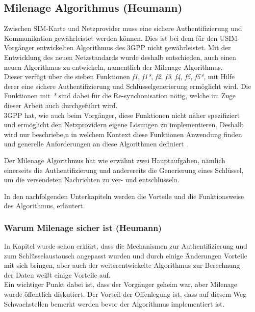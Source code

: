 \subsection{Milenage Algorithmus (Heumann)}
\label{milenage}
Zwischen \ac{SIM}-Karte und Netzprovider muss eine sichere Authentifizierung und
Kommunikation gewährleistet werden können. Dies ist bei dem für den USIM-Vorgänger
entwickelten Algorithmus des \ac{3GPP} nicht
gewährleistet. Mit der Entwicklung des neuen Netzstandards wurde deshalb entschieden,
auch einen neuen Algorithmus zu entwickeln, namentlich der Milenage Algorithmus. \\
Dieser verfügt über die sieben Funktionen \emph{f1}, \emph{f1*}, \emph{f2}, \emph{f3},
\emph{f4}, \emph{f5}, \emph{f5*}, mit Hilfe derer eine sichere Authentifizierung und
Schlüsselgenerierung ermöglicht wird. Die Funktionen mit \emph{*} sind dabei für die
Re-synchonisation nötig, welche im Zuge dieser Arbeit auch durchgeführt wird. \\
3GPP hat, wie auch beim Vorgänger, diese Funktionen nicht näher spezifiziert und ermöglicht
den Netzprovidern eigene Lösungen zu implementieren. Deshalb wird nur beschriebe,n in
welchem Kontext diese Funktionen Anwendung finden und generelle Anforderungen
an diese Algorithmen definiert \cite{3gpp.35.205}.

Der Milenage Algorithmus hat wie erwähnt zwei Hauptaufgaben, nämlich einerseits die
Authentifizierung und anderereits die Generierung eines Schlüssel, um die versendeten Nachrichten zu
ver- und entschlüsseln.

In den nachfolgenden Unterkapiteln werden die Vorteile und die Funktionsweise des
Algorithmus, erläutert.

 \subsubsection{Warum Milenage sicher ist (Heumann)}
 In Kapitel  wurde schon erklärt, dass die Mechanismen
 zur Authentifizierung und zum Schlüsselaustausch angepasst wurden und durch einige
 Änderungen Vorteile mit sich bringen, aber auch der weiterentwickelte Algorithmus zur
 Berechnung der Daten weißt einige Vorteile auf. \\
 Ein wichtiger Punkt dabei ist, dass der Vorgänger geheim war, aber Milenage wurde öffentlich
 diskutiert. Der Vorteil der Offenlegung ist, dass auf diesem Weg Schwachstellen bemerkt werden
 bevor der Algorithmus implementiert ist. 
 
